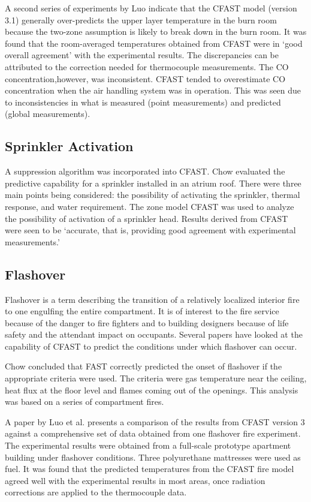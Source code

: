 A second series of experiments by Luo \cite{Luo:1997} indicate that the CFAST model (version 3.1) generally over-predicts the upper layer temperature in the burn room because the two-zone assumption is likely to break down in the burn room. It was found that the room-averaged temperatures obtained from CFAST were in `good overall agreement' with the experimental results. The discrepancies can be attributed to the correction needed for thermocouple measurements. The CO concentration,however, was inconsistent. CFAST tended to overestimate CO concentration when the air handling system was in operation. This was seen due to inconsistencies in what is measured (point measurements) and predicted (global measurements).

\subsection{Sprinkler Activation}

A suppression algorithm \cite{Madrzykowski:1992} was incorporated into CFAST. Chow \cite{Chow:1996a} evaluated the predictive capability for a sprinkler installed in an atrium roof. There were three main points being considered: the possibility of activating the sprinkler, thermal response, and water requirement. The zone model CFAST was used to analyze the possibility of activation of a sprinkler head. Results derived from CFAST were seen to be `accurate, that is, providing good agreement with experimental measurements.'

\subsection{Flashover}

Flashover is a term describing the transition of a relatively localized interior fire to one engulfing the entire compartment. It is of interest to the fire service because of the danger to fire fighters and to building designers because of life safety and the attendant impact on occupants. Several papers have looked at the capability of CFAST to predict the conditions under which flashover can occur.

Chow \cite{Valid:Chow_Flashover} concluded that FAST correctly predicted the onset of flashover if the appropriate criteria were used. The criteria were gas temperature near the ceiling, heat flux at the floor level and flames coming out of the openings. This analysis was based on a series of compartment fires.

A paper by Luo et al. \cite{Valid:Luo_Flashover} presents a comparison of the results from CFAST version 3 against a comprehensive set of data obtained from one flashover fire experiment. The experimental results were obtained from a full-scale prototype apartment building under flashover conditions. Three polyurethane mattresses were used as fuel. It was found that the predicted temperatures from the CFAST fire model agreed well with the experimental results in most areas, once radiation corrections are applied to the thermocouple data.

